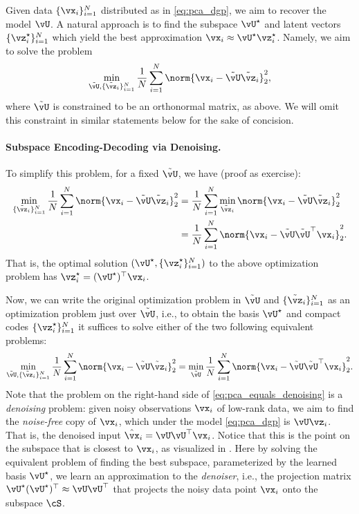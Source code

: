 \documentclass[../../book-main.tex]{subfiles}
\begin{document}
Given data \(\{\vx_{i}\}_{i = 1}^{N}\) distributed as in \eqref{eq:pca_dgp}, we
aim to recover the model \(\vU\). A natural approach is to find the subspace
\(\vU^{\star}\) and latent vectors \(\{\vz_{i}^{\star}\}_{i = 1}^{N}\) which
yield the best approximation \(\vx_{i} \approx
\vU^{\star}\vz_{i}^{\star}\). Namely, we aim to solve the problem
\begin{equation}\label{eq:pca_sparse_recovery_problem}
    \min_{\tilde{\vU}, \{\tilde{\vz}_{i}\}_{i =
    1}^{N}}\frac{1}{N}\sum_{i = 1}^{N}\norm{\vx_{i} -
    \tilde{\vU}\tilde{\vz}_{i}}_{2}^{2},
\end{equation}
where $\tilde{\vU}$ is constrained to be an orthonormal matrix, as
above. We will omit
this constraint in similar statements below for the sake of concision.

\paragraph{Subspace Encoding-Decoding via Denoising.}
To simplify this problem, for a fixed \(\tilde{\vU}\), we have (proof
as exercise):
\begin{align}
    \min_{\{\tilde{\vz}_{i}\}_{i = 1}^{N}}\frac{1}{N}\sum_{i =
    1}^{N}\norm{\vx_{i} - \tilde{\vU}\tilde{\vz}_{i}}_{2}^{2}
    &= \frac{1}{N}\sum_{i = 1}^{N}\min_{\tilde{\vz}_{i}}\norm{\vx_{i}
    - \tilde{\vU}\tilde{\vz}_{i}}_{2}^{2} \\
    &= \frac{1}{N}\sum_{i = 1}^{N}\norm{\vx_{i} -
    \tilde{\vU}\tilde{\vU}^{\top}\vx_{i}}_{2}^{2}.
\end{align}
That is, the optimal solution \((\vU^{\star}, \{\vz_{i}^{\star}\}_{i = 1}^{N})\)
to the above optimization problem has $\vz_i^{\star} = (\vU^{\star})^\top\vx_i$.

Now, we can write the original optimization problem in \(\tilde{\vU}\)
and \(\{\tilde{\vz}_{i}\}_{i = 1}^{N}\) as an optimization problem just over
\(\tilde{\vU}\), i.e., to obtain the basis \(\vU^{\star}\) and compact codes
\(\{\vz_{i}^{\star}\}_{i = 1}^{N}\) it suffices to solve either of
the two following equivalent problems:
\begin{equation}\label{eq:pca_equals_denoising}
    \min_{\tilde{\vU}, \{\tilde{\vz}_{i}\}_{i =
    1}^{N}}\frac{1}{N}\sum_{i = 1}^{N}\norm{\vx_{i} -
    \tilde{\vU}\tilde{\vz}_{i}}_{2}^{2} =
    \min_{\tilde{\vU}}\frac{1}{N}\sum_{i = 1}^{N}\norm{\vx_{i} -
    \tilde{\vU}\tilde{\vU}^{\top}\vx_{i}}_{2}^{2}.
\end{equation}
Note that the problem on the right-hand side of \eqref{eq:pca_equals_denoising}
is a \textit{denoising} problem: given noisy observations \(\vx_{i}\) of
low-rank data, we aim to find the \textit{noise-free} copy of \(\vx_{i}\), which
under the model \eqref{eq:pca_dgp} is $\vU\vz_{i}$. That is, the denoised input
$\hat{\vx}_i = \vU\vU^\top \vx_i$. Notice that this is the point on the subspace
that is closest to $\vx_i$, as visualized in . Here by
solving the equivalent problem of finding the best subspace, parameterized by
the learned basis \(\vU^{\star}\), we learn an approximation to the
\textit{denoiser}, i.e., the projection matrix
\(\vU^{\star}(\vU^{\star})^{\top} \approx \vU\vU^{\top}\) that
projects the noisy data point $\vx_i$ onto the subspace \(\cS\). %
\end{document}
